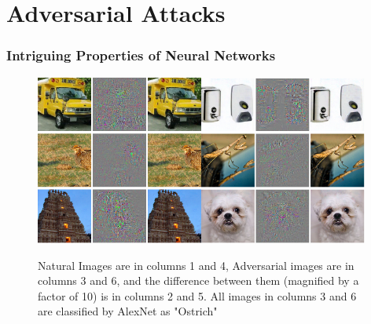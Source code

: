 \section{Adversarial Attacks}

\label{Chapter2} %


\begin{frame}
  \frametitle{Intriguing Properties of Neural Networks \cite{Szegedy2013}}
\begin{figure}[H]
    \centering
\includegraphics[width=5.5cm]{szegedy/negative1.png}\includegraphics[width=5.5cm]{szegedy/negative2.png}
    \caption{Natural Images are in columns 1 and 4, Adversarial images are in columns 3 and 6, and the difference between them (magnified by a factor of 10) is in columns 2 and 5. All images in columns 3 and 6 are classified by AlexNet as "Ostrich" \cite{Szegedy2013}}
    \label{fig:my_label}
\end{figure}
\end{frame}



